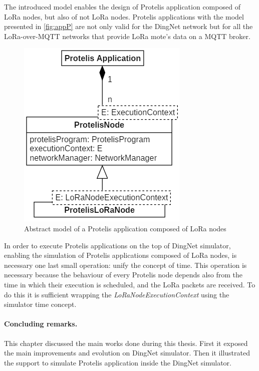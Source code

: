 % 
The introduced model enables the design of Protelis application composed of LoRa nodes, but also of not LoRa nodes.
Protelis applications with the model presented in \autoref{fig:appP} are not only valid for the DingNet network but for all the LoRa-over-MQTT networks that provide LoRa mote's data on a MQTT broker.
% 
\begin{figure}[H]
    \centering
    \includegraphics{figures/app.png}
    \caption{Abstract model of a Protelis application composed of LoRa nodes}
    \label{fig:appP}
\end{figure}
% 
\noindent In order to execute Protelis applications on the top of DingNet simulator, enabling the simulation of Protelis applications composed of LoRa nodes, is necessary one last small operation: unify the concept of time. 
This operation is necessary because the behaviour of every Protelis node depends also from the time in which their execution is scheduled, and the LoRa packets are received.
To do this it is sufficient wrapping the \mbox{\textit{LoRaNodeExecutionContext}} using the simulator time concept.

\paragraph{Concluding remarks.} This chapter discussed the main works done during this thesis. First it exposed the main improvements and evolution on DingNet simulator. Then it illustrated the support to simulate Protelis application inside the DingNet simulator.